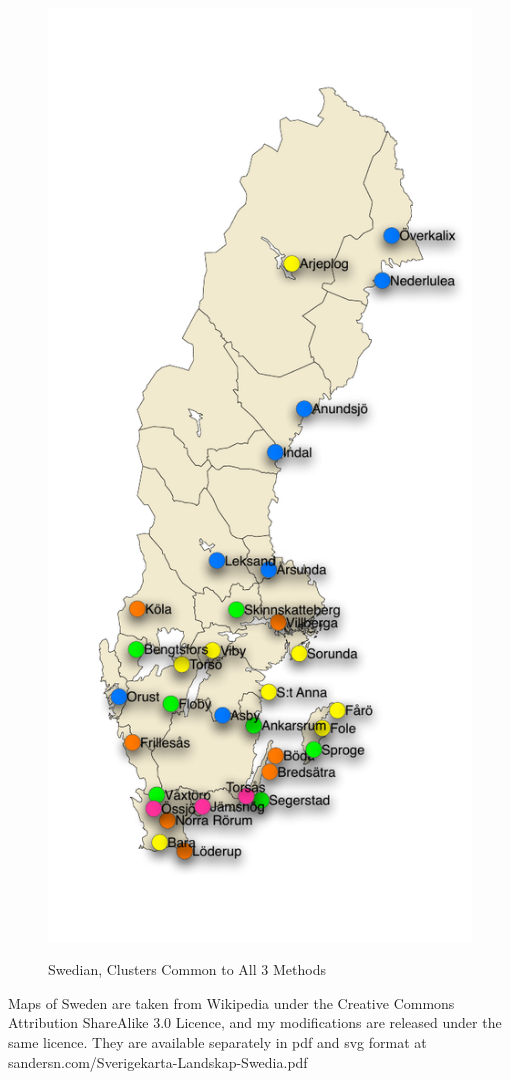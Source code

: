\begin{figure}
  \includegraphics{Sverigekarta-Landskap-Swedia} %
  \label{agree-clusters}
  \caption{Swedian, Clusters Common to All 3 Methods}
\end{figure}
Maps of Sweden are taken from Wikipedia under the Creative Commons
Attribution ShareAlike 3.0 Licence, and my modifications are released
under the same licence. They are available separately in pdf and svg
format at sandersn.com/Sverigekarta-Landskap-Swedia.pdf

